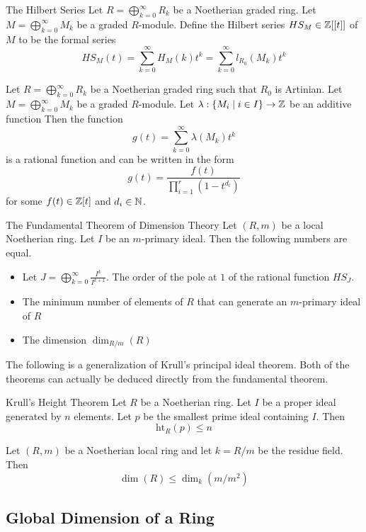 \documentclass[a4paper]{article}
\begin{document}
\begin{defn}{The Hilbert Series}{} Let $R=\bigoplus_{k=0}^\infty R_k$ be a Noetherian graded ring. Let $M=\bigoplus_{k=0}^\infty M_k$ be a graded $R$-module. Define the Hilbert series $HS_M\in\mathbb{Z}[[t]]$ of $M$ to be the formal series $$HS_M(t)=\sum_{k=0}^\infty H_M(k)t^k=\sum_{k=0}^\infty l_{R_0}(M_k)t^k$$
\end{defn}

\begin{thm}{}{} Let $R=\bigoplus_{k=0}^\infty R_k$ be a Noetherian graded ring such that $R_0$ is Artinian. Let $M=\bigoplus_{k=0}^\infty M_k$ be a graded $R$-module. Let $\lambda:\{M_i\;|\;i\in I\}\to\mathbb{Z}$ be an additive function Then the function $$g(t)=\sum_{k=0}^\infty\lambda(M_k)t^k$$ is a rational function and can be written in the form $$g(t)=\frac{f(t)}{\prod_{i=1}^r(1-t^{d_i})}$$ for some $f(t)\in\mathbb{Z}[t]$ and $d_i\in\mathbb{N}$. 
\end{thm}

\begin{thm}{The Fundamental Theorem of Dimension Theory}{} Let $(R,m)$ be a local Noetherian ring. Let $I$ be an $m$-primary ideal. Then the following numbers are equal. 
\begin{itemize}
\item Let $J=\bigoplus_{k=0}^\infty\frac{I^k}{I^{k+1}}$. The order of the pole at $1$ of the rational function $HS_J$. 
\item The minimum number of elements of $R$ that can generate an $m$-primary ideal of $R$
\item The dimension $\dim_{R/m}(R)$
\end{itemize}
\end{thm}

The following is a generalization of Krull's principal ideal theorem. Both of the theorems can actually be deduced directly from the fundamental theorem. 

\begin{thm}{Krull's Height Theorem}{} Let $R$ be a Noetherian ring. Let $I$ be a proper ideal generated by $n$ elements. Let $p$ be the smallest prime ideal containing $I$. Then $$\text{ht}_R(p)\leq n$$
\end{thm}

\begin{thm}{}{} Let $(R,m)$ be a Noetherian local ring and let $k=R/m$ be the residue field. Then $$\dim(R)\leq\dim_k(m/m^2)$$
\end{thm}

\subsection{Global Dimension of a Ring}
\end{document}
